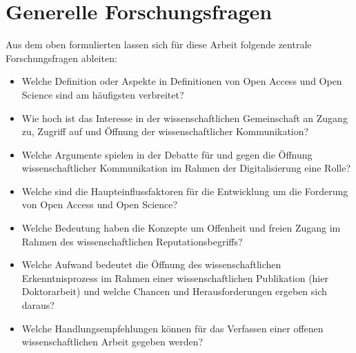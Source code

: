 \section{Generelle Forschungsfragen}

Aus dem oben formulierten lassen sich für diese Arbeit folgende zentrale Forschungsfragen ableiten:
\begin{itemize}
\item Welche Definition oder Aspekte in Definitionen von Open Access und Open Science sind am häufigsten verbreitet?
\item Wie hoch ist das Interesse in der wissenschaftlichen Gemeinschaft an Zugang zu, Zugriff auf und Öffnung der wissenschaftlicher Kommunikation?
\item Welche Argumente spielen in der Debatte für und gegen die Öffnung wissenschaftlicher Kommunikation im Rahmen der Digitalisierung eine Rolle?
\item Welche sind die Haupteinflussfaktoren für die Entwicklung um die Forderung von Open Access und Open Science?
\item Welche Bedeutung haben die Konzepte um Offenheit und freien Zugang im Rahmen des wissenschaftlichen Reputationsbegriffs?
\item Welche Aufwand bedeutet die Öffnung des wissenschaftlichen Erkenntnisprozess im Rahmen einer wissenschaftlichen Publikation (hier Doktorarbeit) und welche Chancen und Herausforderungen ergeben sich daraus?
\item Welche Handlungsempfehlungen können für das Verfassen einer offenen wissenschaftlichen Arbeit gegeben werden?
\end{itemize}

